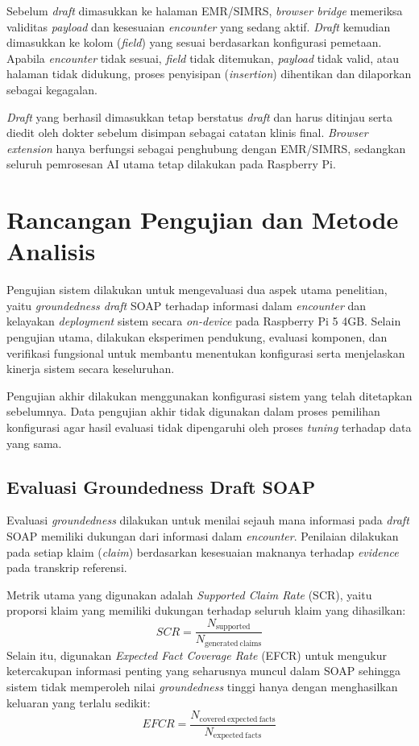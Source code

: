 Sebelum \emph{draft} dimasukkan ke halaman EMR/SIMRS, \emph{browser bridge} memeriksa validitas \emph{payload} dan kesesuaian \emph{encounter} yang sedang aktif. \emph{Draft} kemudian dimasukkan ke kolom (\emph{field}) yang sesuai berdasarkan konfigurasi pemetaan. Apabila \emph{encounter} tidak sesuai, \emph{field} tidak ditemukan, \emph{payload} tidak valid, atau halaman tidak didukung, proses penyisipan (\emph{insertion}) dihentikan dan dilaporkan sebagai kegagalan.

\emph{Draft} yang berhasil dimasukkan tetap berstatus \emph{draft} dan harus ditinjau serta diedit oleh dokter sebelum disimpan sebagai catatan klinis final. \emph{Browser extension} hanya berfungsi sebagai penghubung dengan EMR/SIMRS, sedangkan seluruh pemrosesan AI utama tetap dilakukan pada Raspberry Pi.

\section{Rancangan Pengujian dan Metode Analisis}
\label{sec:rancanganpengujian}

Pengujian sistem dilakukan untuk mengevaluasi dua aspek utama penelitian, yaitu \emph{groundedness draft} SOAP terhadap informasi dalam \emph{encounter} dan kelayakan \emph{deployment} sistem secara \emph{on-device} pada Raspberry Pi 5 4GB. Selain pengujian utama, dilakukan eksperimen pendukung, evaluasi komponen, dan verifikasi fungsional untuk membantu menentukan konfigurasi serta menjelaskan kinerja sistem secara keseluruhan.

Pengujian akhir dilakukan menggunakan konfigurasi sistem yang telah ditetapkan sebelumnya. Data pengujian akhir tidak digunakan dalam proses pemilihan konfigurasi agar hasil evaluasi tidak dipengaruhi oleh proses \emph{tuning} terhadap data yang sama.

\subsection{Evaluasi Groundedness Draft SOAP}
\label{subsec:evaluasigroundedness}

Evaluasi \emph{groundedness} dilakukan untuk menilai sejauh mana informasi pada \emph{draft} SOAP memiliki dukungan dari informasi dalam \emph{encounter}. Penilaian dilakukan pada setiap klaim (\emph{claim}) berdasarkan kesesuaian maknanya terhadap \emph{evidence} pada transkrip referensi.

Metrik utama yang digunakan adalah \emph{Supported Claim Rate} (SCR), yaitu proporsi klaim yang memiliki dukungan terhadap seluruh klaim yang dihasilkan:
\begin{equation}
SCR = \frac{N_{\mathrm{supported}}}{N_{\mathrm{generated\ claims}}}
\label{eq:scr}
\end{equation}
Selain itu, digunakan \emph{Expected Fact Coverage Rate} (EFCR) untuk mengukur ketercakupan informasi penting yang seharusnya muncul dalam SOAP sehingga sistem tidak memperoleh nilai \emph{groundedness} tinggi hanya dengan menghasilkan keluaran yang terlalu sedikit:
\begin{equation}
EFCR = \frac{N_{\mathrm{covered\ expected\ facts}}}{N_{\mathrm{expected\ facts}}}
\label{eq:efcr}
\end{equation}


